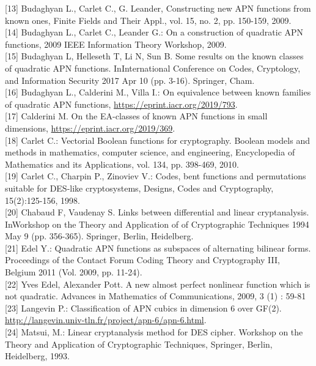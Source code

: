 \documentclass[10pt]{article}
\begin{document}
[13] Budaghyan L., Carlet C., G. Leander, Constructing new APN functions from known ones, Finite Fields and Their Appl., vol. 15, no. 2, pp. 150-159, 2009.\\[0pt]
[14] Budaghyan L., Carlet C., Leander G.: On a construction of quadratic APN functions, 2009 IEEE Information Theory Workshop, 2009.\\[0pt]
[15] Budaghyan L, Helleseth T, Li N, Sun B. Some results on the known classes of quadratic APN functions. InInternational Conference on Codes, Cryptology, and Information Security 2017 Apr 10 (pp. 3-16). Springer, Cham.\\[0pt]
[16] Budaghyan L., Calderini M., Villa I.: On equivalence between known families of quadratic APN functions, \href{https://eprint.iacr.org/2019/793}{https://eprint.iacr.org/2019/793}.\\[0pt]
[17] Calderini M. On the EA-classes of known APN functions in small dimensions, \href{https://eprint.iacr.org/2019/369}{https://eprint.iacr.org/2019/369}.\\[0pt]
[18] Carlet C.: Vectorial Boolean functions for cryptography. Boolean models and methods in mathematics, computer science, and engineering, Encyclopedia of Mathematics and its Applications, vol. 134, pp. 398-469, 2010.\\[0pt]
[19] Carlet C., Charpin P., Zinoviev V.: Codes, bent functions and permutations suitable for DES-like cryptosystems, Designs, Codes and Cryptography, 15(2):125-156, 1998.\\[0pt]
[20] Chabaud F, Vaudenay S. Links between differential and linear cryptanalysis. InWorkshop on the Theory and Application of of Cryptographic Techniques 1994 May 9 (pp. 356-365). Springer, Berlin, Heidelberg.\\[0pt]
[21] Edel Y.: Quadratic APN functions as subspaces of alternating bilinear forms. Proceedings of the Contact Forum Coding Theory and Cryptography III, Belgium 2011 (Vol. 2009, pp. 11-24).\\[0pt]
[22] Yves Edel, Alexander Pott. A new almost perfect nonlinear function which is not quadratic. Advances in Mathematics of Communications, 2009, 3 (1) : 59-81\\[0pt]
[23] Langevin P.: Classification of APN cubics in dimension 6 over GF(2). \href{http://langevin.univ-tln.fr/project/apn-6/apn-6.html}{http://langevin.univ-tln.fr/project/apn-6/apn-6.html}.\\[0pt]
[24] Matsui, M.: Linear cryptanalysis method for DES cipher. Workshop on the Theory and Application of Cryptographic Techniques, Springer, Berlin, Heidelberg, 1993.\\[0pt]
\end{document}
